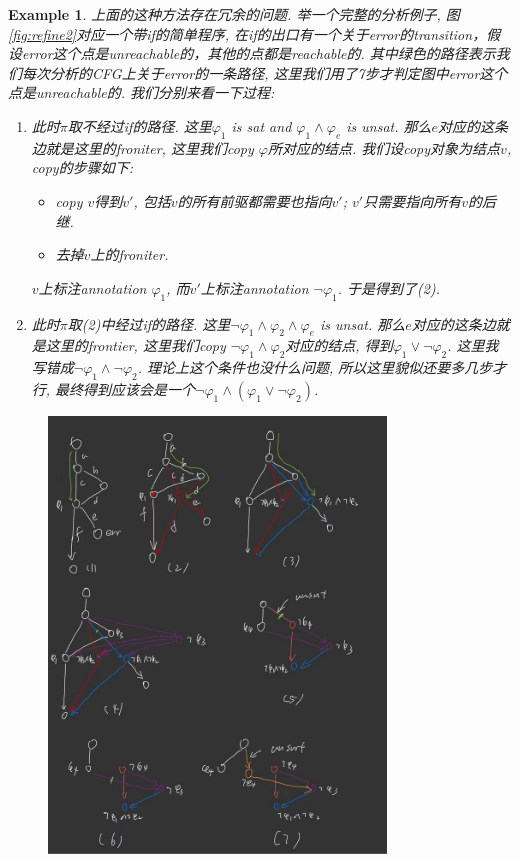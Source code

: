 \documentclass{article}
\newtheorem{example}[theorem]{Example}
\begin{document}
\begin{example}
    上面的这种方法存在冗余的问题. 举一个完整的分析例子, 图\ref{fig:refine2}对应一个带if的简单程序, 在if的出口有一个关于error的transition，假设error这个点是unreachable的，其他的点都是reachable的. 其中绿色的路径表示我们每次分析的CFG上关于error的一条路径, 这里我们用了7步才判定图中error这个点是unreachable的. 我们分别来看一下过程:
    \begin{enumerate}
    	\item 此时$\pi$取不经过if的路径. 这里$\varphi_1$ is sat and  $\varphi_1 \wedge \varphi_e$ is unsat. 那么$e$对应的这条边就是这里的froniter, 这里我们copy $\varphi$所对应的结点. 我们设copy对象为结点$v$, copy的步骤如下:
    	\begin{itemize}
    		\item copy $v$得到$v'$, 包括$v$的所有前驱都需要也指向$v'$; $v'$只需要指向所有$v$的后继.
    		\item 去掉$v$上的froniter. 
    	\end{itemize}
		$v$上标注annotation $\varphi_1$, 而$v'$上标注annotation $\neg \varphi_1$. 于是得到了(2).
		\item 此时$\pi$取(2)中经过if的路径. 这里$\neg \varphi_1 \wedge \varphi_2 \wedge \varphi_e$ is unsat. 那么$e$对应的这条边就是这里的frontier, 这里我们copy $\neg \varphi_1 \wedge \varphi_2$对应的结点, 得到$\varphi_1 \vee \neg \varphi_2$. 这里我写错成$\neg \varphi_1 \wedge \neg \varphi_2$. 理论上这个条件也没什么问题, 所以这里貌似还要多几步才行, 最终得到应该会是一个$\neg \varphi_1 \wedge (\varphi_1 \vee \neg \varphi_2)$.
    \end{enumerate}
    \begin{figure}[H]
    \centering
    \includegraphics[width=0.8\textwidth]{images/refine2.jpeg}

\end{figure}
\end{example}
\end{document}
